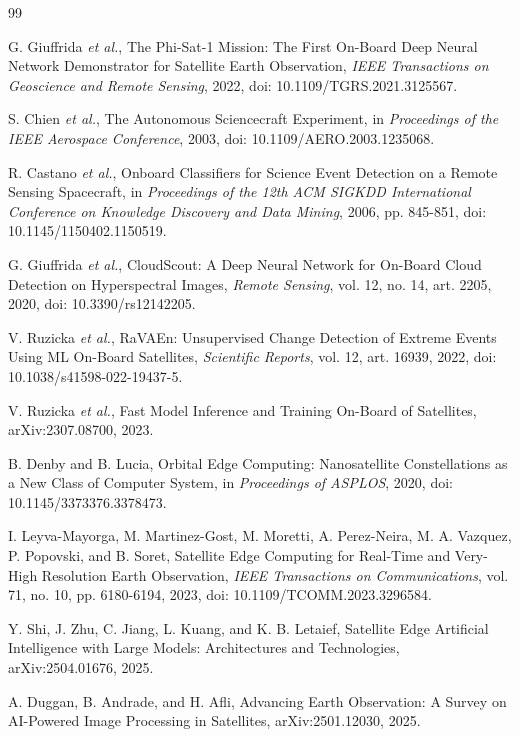 \documentclass[10pt,letterpaper]{article}
\begin{document}
\begin{thebibliography}{99}

G. Giuffrida \emph{et al.}, The Phi-Sat-1 Mission: The First On-Board Deep Neural Network Demonstrator for Satellite Earth Observation, \emph{IEEE Transactions on Geoscience and Remote Sensing}, 2022, doi: 10.1109/TGRS.2021.3125567.

S. Chien \emph{et al.}, The Autonomous Sciencecraft Experiment, in \emph{Proceedings of the IEEE Aerospace Conference}, 2003, doi: 10.1109/AERO.2003.1235068.

R. Castano \emph{et al.}, Onboard Classifiers for Science Event Detection on a Remote Sensing Spacecraft, in \emph{Proceedings of the 12th ACM SIGKDD International Conference on Knowledge Discovery and Data Mining}, 2006, pp. 845-851, doi: 10.1145/1150402.1150519.

G. Giuffrida \emph{et al.}, CloudScout: A Deep Neural Network for On-Board Cloud Detection on Hyperspectral Images, \emph{Remote Sensing}, vol. 12, no. 14, art. 2205, 2020, doi: 10.3390/rs12142205.

V. Ruzicka \emph{et al.}, RaVAEn: Unsupervised Change Detection of Extreme Events Using ML On-Board Satellites, \emph{Scientific Reports}, vol. 12, art. 16939, 2022, doi: 10.1038/s41598-022-19437-5.

V. Ruzicka \emph{et al.}, Fast Model Inference and Training On-Board of Satellites, arXiv:2307.08700, 2023.

B. Denby and B. Lucia, Orbital Edge Computing: Nanosatellite Constellations as a New Class of Computer System, in \emph{Proceedings of ASPLOS}, 2020, doi: 10.1145/3373376.3378473.

I. Leyva-Mayorga, M. Martinez-Gost, M. Moretti, A. Perez-Neira, M. A. Vazquez, P. Popovski, and B. Soret, Satellite Edge Computing for Real-Time and Very-High Resolution Earth Observation, \emph{IEEE Transactions on Communications}, vol. 71, no. 10, pp. 6180-6194, 2023, doi: 10.1109/TCOMM.2023.3296584.

Y. Shi, J. Zhu, C. Jiang, L. Kuang, and K. B. Letaief, Satellite Edge Artificial Intelligence with Large Models: Architectures and Technologies, arXiv:2504.01676, 2025.

A. Duggan, B. Andrade, and H. Afli, Advancing Earth Observation: A Survey on AI-Powered Image Processing in Satellites, arXiv:2501.12030, 2025.


\end{thebibliography}
\end{document}
